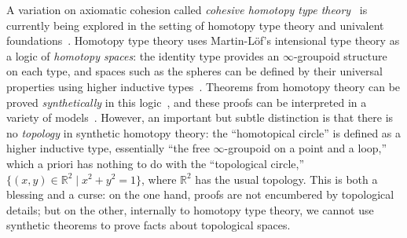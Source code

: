 \documentclass{drl-common/llncs}
\begin{document}
A variation on axiomatic cohesion called \emph{cohesive homotopy type
  theory}~\citep{schreiber13dcct,schreibershulman12cohesive,shulman15realcohesion} is
currently being explored in the setting of homotopy type theory and
univalent foundations~\citep{voevodsky06homotopy,uf13hott-book}.
Homotopy type theory uses Martin-L\"of's intensional type theory as a
logic of \emph{homotopy spaces}: the identity type provides an
$\infty$-groupoid structure on each type, and spaces such as the spheres
can be defined by their universal properties using higher inductive
types~\citep{lumsdaine+13hits,shulman11hitsblog,lumsdaine11hitsblog}.
Theorems from homotopy theory can be proved \emph{synthetically} in this
logic~\citep{ls13pi1s1,lb13pinsn,lf14emspace,lb15cubical,favonia14covering,cavallo14mayervietoris},
and these proofs can be interpreted in a variety of
models~\citep{shulman13inversediag,voevodsky+12simpluniv,coquand+13cubical}.
However, an important but subtle distinction is that there is no
\emph{topology} in synthetic homotopy theory: the ``homotopical circle''
is defined as a higher inductive type, essentially ``the free
$\infty$-groupoid on a point and a loop,'' which a priori has nothing to
do with the ``topological circle,'' $\{ (x,y) \in \mathbb{R}^2 \mid x^2
+ y^2 = 1\}$, where $\mathbb{R}^2$ has the usual topology.  This is both
a blessing and a curse: on the one hand, proofs are not encumbered by
topological details; but on the other, internally to homotopy type
theory, we cannot use synthetic theorems to prove facts about
topological spaces.
\end{document}
